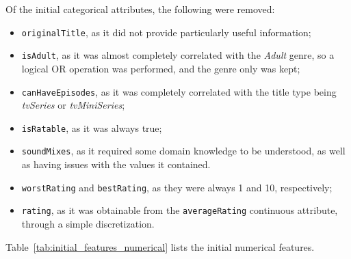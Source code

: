 Of the initial categorical attributes, the following were removed:
\begin{itemize}
    \item \texttt{originalTitle}, as it did not provide particularly useful
    information;
    \item \texttt{isAdult}, as it was almost completely correlated with the
    \textit{Adult} genre, so a logical OR operation was performed, and the genre
    only was kept;
    \item \texttt{canHaveEpisodes}, as it was completely correlated with the title type
    being \textit{tvSeries} or \textit{tvMiniSeries};
    \item \texttt{isRatable}, as it was always true;
    \item \texttt{soundMixes}, as it required some domain knowledge to be understood, as well as having issues with the values it contained.
    \item \texttt{worstRating} and \texttt{bestRating}, as they were always
    1 and 10, respectively;
    \item \texttt{rating}, as it was obtainable from the \texttt{averageRating}
    continuous attribute, through a simple discretization.
\end{itemize}


Table~\ref{tab:initial_features_numerical} lists the initial numerical features.


